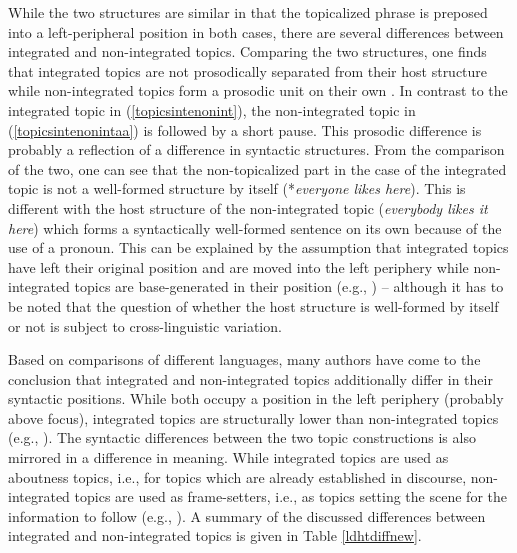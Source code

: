 \noindent While the two structures are similar in that the topicalized phrase is preposed into a left-peripheral position in both cases, there are several differences between integrated and non-integrated topics. Comparing the two structures, one finds that integrated topics are not prosodically separated from their host structure while non-integrated topics form a prosodic unit on their own \citep{shaer2004integrated}. In contrast to the integrated topic in (\ref{topicsintenonint}), the non-integrated topic in (\ref{topicsintenonintaa}) is followed by a short pause. This prosodic difference is probably a reflection of a difference in syntactic structures. From the comparison of the two, one can see that the non-topicalized part in the case of the integrated topic is not a well-formed structure by itself (*\textit{everyone likes here}). This is different with the host structure of the non-integrated topic (\textit{everybody likes it here}) which forms a syntactically well-formed sentence on its own because of the use of a pronoun. This can be explained by the assumption that integrated topics have left their original position and are moved into the left periphery while non-integrated topics are base-generated in their position (e.g., \citealt{rodman1974left, vat1981left, grohmann2003prolific}) -- although it has to be noted that the question of whether the host structure is well-formed by itself or not is subject to cross-linguistic variation.

Based on comparisons of different languages, many authors have come to the conclusion that integrated and non-integrated topics additionally differ in their syntactic positions. While both occupy a position in the left periphery (probably above focus), integrated topics are structurally lower than non-integrated topics (e.g., \citealt{cinque1990types, benincapol2004topic, frascarelli2007subjects}). The syntactic differences between the two topic constructions is also mirrored in a difference in meaning. While integrated topics are used as aboutness topics, i.e., for topics which are already established in discourse, non-integrated topics are used as frame-setters, i.e., as topics setting the scene for the information to follow (e.g., \citealt{rodman1974left, reinhart1981pragmatics, de2000topic}). A summary of the discussed differences between integrated and non-integrated topics is given in Table \ref{ldhtdiffnew}.


